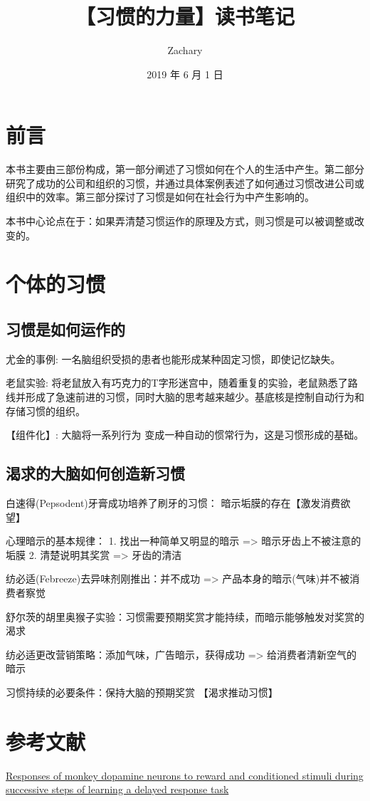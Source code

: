 \documentclass[geye,green,pad,cn]{elegantnote}
\title{【习惯的力量】读书笔记}
\author{Zachary}
\date{2019 年 6 月 1 日}
\begin{document}
\maketitle
\tableofcontents

\section{前言}
本书主要由三部份构成，第一部分阐述了习惯如何在个人的生活中产生。第二部分研究了成功的公司和组织的习惯，并通过具体案例表述了如何通过习惯改进公司或组织中的效率。第三部分探讨了习惯是如何在社会行为中产生影响的。

本书中心论点在于：如果弄清楚习惯运作的原理及方式，则习惯是可以被调整或改变的。

\section{个体的习惯}
\subsection{习惯是如何运作的}
尤金的事例: 一名脑组织受损的患者也能形成某种固定习惯，即使记忆缺失。

老鼠实验:  将老鼠放入有巧克力的T字形迷宫中，随着重复的实验，老鼠熟悉了路线并形成了急速前进的习惯，同时大脑的思考越来越少。基底核是控制自动行为和存储习惯的组织。

【组件化】: 大脑将一系列行为  变成一种自动的惯常行为，这是习惯形成的基础。

\subsection{渴求的大脑如何创造新习惯}
白速得(Pepsodent)牙膏成功培养了刷牙的习惯： 暗示垢膜的存在【激发消费欲望】

心理暗示的基本规律：
1. 找出一种简单又明显的暗示 => 暗示牙齿上不被注意的垢膜
2. 清楚说明其奖赏 => 牙齿的清洁

纺必适(Febreeze)去异味剂刚推出：并不成功 => 产品本身的暗示(气味)并不被消费者察觉

舒尔茨的胡里奥猴子实验：习惯需要预期奖赏才能持续，而暗示能够触发对奖赏的渴求

纺必适更改营销策略：添加气味，广告暗示，获得成功 => 给消费者清新空气的暗示

习惯持续的必要条件：保持大脑的预期奖赏 【渴求推动习惯】

\section{参考文献}
\href{http://www.jneurosci.org/content/13/3/900.short}{Responses of monkey dopamine neurons to reward and conditioned stimuli during successive steps of learning a delayed response task}
\end{document}
